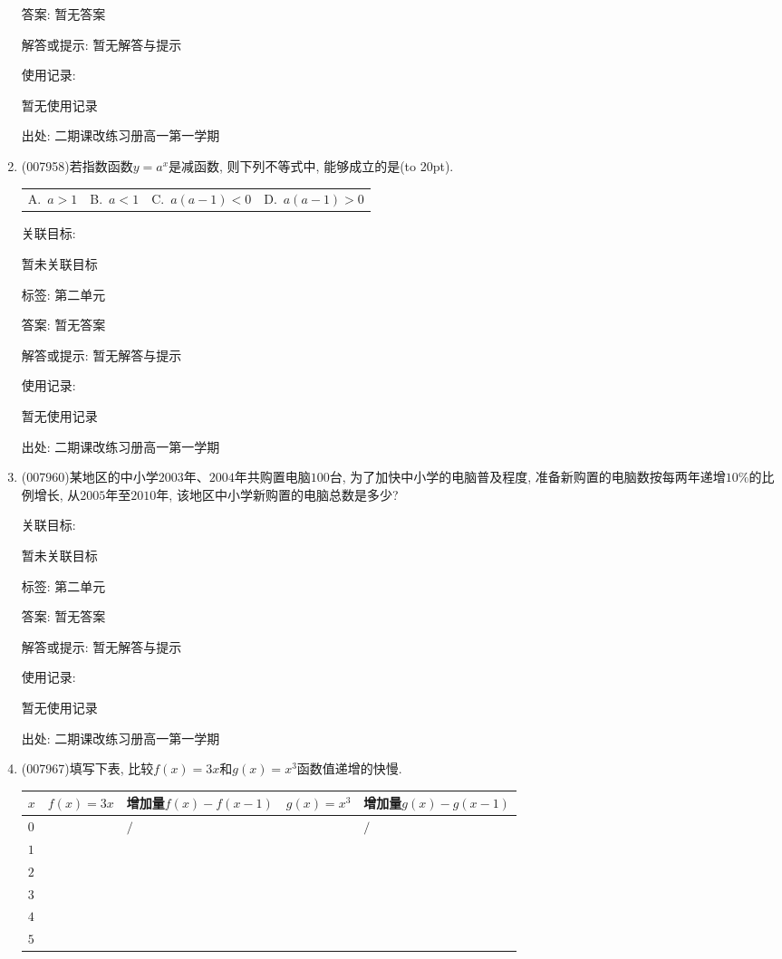 \documentclass[10pt,a4paper]{article}
\newcommand{\bracket}[1]{(\hbox to #1pt{})}
\newcommand{\fourch}[4]{\par\begin{tabular}{p{.23\textwidth}p{.23\textwidth}p{.23\textwidth}p{.23\textwidth}}
A.~#1 &B.~#2& C.~#3& D.~#4
\end{tabular}}
\begin{document}
\begin{enumerate}[1.]
答案: 暂无答案

解答或提示: 暂无解答与提示

使用记录:

暂无使用记录


出处: 二期课改练习册高一第一学期
\item { (007958)}若指数函数$y=a^x$是减函数, 则下列不等式中, 能够成立的是\bracket{20}.
\fourch{$a>1$}{$a<1$}{$a(a-1)<0$}{$a(a-1)>0$}


关联目标:

暂未关联目标



标签: 第二单元

答案: 暂无答案

解答或提示: 暂无解答与提示

使用记录:

暂无使用记录


出处: 二期课改练习册高一第一学期
\item { (007960)}某地区的中小学$2003$年、$2004$年共购置电脑$100$台, 为了加快中小学的电脑普及程度, 准备新购置的电脑数按每两年递增$10\%$的比例增长, 从$2005$年至$2010$年, 该地区中小学新购置的电脑总数是多少?


关联目标:

暂未关联目标



标签: 第二单元

答案: 暂无答案

解答或提示: 暂无解答与提示

使用记录:

暂无使用记录


出处: 二期课改练习册高一第一学期
\item { (007967)}填写下表, 比较$f(x)=3x$和$g(x)=x^3$函数值递增的快慢.
\begin{center}
    \begin{tabular}{|p{}<{\centering}|p{}<{\centering}|p{}<{\centering}|p{}<{\centering}|p{}<{\centering}|}
        \hline
        $x$ & $f(x)=3x$ & 增加量$f(x)-f(x-1)$ & $g(x)=x^3$ & 增加量$g(x)-g(x-1)$ \\ \hline
        $0$ & & $\slash$ & & $\slash$ \\ \hline
        $1$ & & & & \\ \hline
        $2$ & & & & \\ \hline
        $3$ & & & & \\ \hline
        $4$ & & & & \\ \hline
        $5$ & & & & \\ \hline
    \end{tabular}
\end{center}



\end{enumerate}
\end{document}
